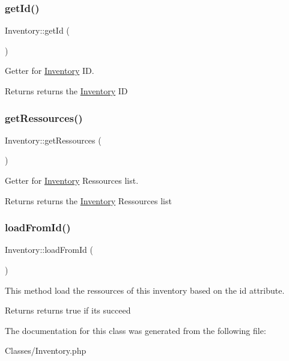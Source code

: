\subsubsection{\texorpdfstring{get\+Id()}{getId()}}
{\footnotesize\ttfamily Inventory\+::get\+Id (\begin{DoxyParamCaption}{ }\end{DoxyParamCaption})}



Getter for \mbox{\hyperlink{classInventory}{Inventory}} ID. 

\begin{DoxyReturn}{Returns}
returns the \mbox{\hyperlink{classInventory}{Inventory}} ID 
\end{DoxyReturn}
\mbox{\label{classInventory_a9b570bb7650509c786bc066347229979}} 
\subsubsection{\texorpdfstring{get\+Ressources()}{getRessources()}}
{\footnotesize\ttfamily Inventory\+::get\+Ressources (\begin{DoxyParamCaption}{ }\end{DoxyParamCaption})}



Getter for \mbox{\hyperlink{classInventory}{Inventory}} Ressources list. 

\begin{DoxyReturn}{Returns}
returns the \mbox{\hyperlink{classInventory}{Inventory}} Ressources list 
\end{DoxyReturn}
\mbox{\label{classInventory_ad5fa182aefcd1e26ae373b70bd23a7a5}} 
\subsubsection{\texorpdfstring{load\+From\+Id()}{loadFromId()}}
{\footnotesize\ttfamily Inventory\+::load\+From\+Id (\begin{DoxyParamCaption}{ }\end{DoxyParamCaption})}



This method load the ressources of this inventory based on the id attribute. 

\begin{DoxyReturn}{Returns}
returns true if it\textquotesingle{}s succeed 
\end{DoxyReturn}


The documentation for this class was generated from the following file\+:\begin{DoxyCompactItemize}
\item 
Classes/Inventory.\+php\end{DoxyCompactItemize}
